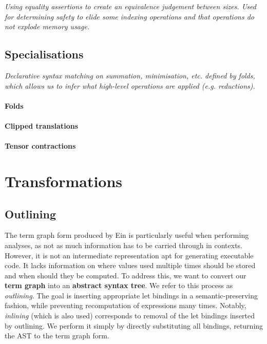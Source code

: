 \textit{Using equality assertions to create an equivalence judgement between sizes. Used for determining safety to elide some indexing operations and that operations do not explode memory usage.}
\todothis

\subsection{Specialisations}

\textit{Declarative syntax matching on summation, minimisation, etc. defined by folds, which allows us to infer what high-level operations are applied (e.g. reductions).} \todothis

\paragraph{Folds}

\paragraph{Clipped translations}

\paragraph{Tensor contractions} 

\section{Transformations}

\subsection{Outlining}

The term graph form produced by Ein is particularly useful when performing analyses, as not as much information has to be carried through in contexts. However, it is not an intermediate representation apt for generating executable code. It lacks information on where values used multiple times should be stored and when should they be computed. To address this, we want to convert our \textbf{term graph} into an \textbf{abstract syntax tree}. We refer to this process as \textit{outlining}. The goal is inserting appropriate let bindings in a semantic-preserving fashion, while preventing recomputation of expressions many times. Notably, \textit{inlining} (which is also used) corresponds to removal of the let bindings inserted by outlining. We perform it simply by directly substituting all bindings, returning the AST to the term graph form.

